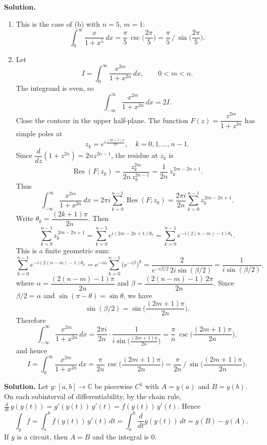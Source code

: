 \noindent\textbf{Solution.}
\begin{enumerate}[label=(\alph*)]
\item This is the case of (b) with $n=5$, $m=1$:
\[\int_0^{\infty}\frac{x}{1+x^5}\,dx=\frac{\pi}{5}\,\csc\!\Big(\frac{2\pi}{5}\Big)=\frac{\pi}{5}\,\Big/\,\sin\!\Big(\frac{2\pi}{5}\Big).\]

\item Let
\[I=\int_0^{\infty}\frac{x^{2m}}{1+x^{2n}}\,dx,\qquad 0<m<n.\]
The integrand is even, so
\[\int_{-\infty}^{\infty}\frac{x^{2m}}{1+x^{2n}}\,dx=2I.\]
Close the contour in the upper half-plane. The function $F(z)=\dfrac{z^{2m}}{1+z^{2n}}$ has simple poles at
\[z_k=e^{i\frac{(2k+1)\pi}{2n}},\quad k=0,1,\dots,n-1.\]
Since $\dfrac{d}{dz}(1+z^{2n})=2n z^{2n-1}$, the residue at $z_k$ is
\[\operatorname{Res}(F;z_k)=\frac{z_k^{2m}}{2n\,z_k^{2n-1}}=\frac{1}{2n}\,z_k^{\,2m-2n+1}.\]
Thus
\[\int_{-\infty}^{\infty}\frac{x^{2m}}{1+x^{2n}}\,dx=2\pi i\sum_{k=0}^{n-1}\operatorname{Res}(F;z_k)=\frac{2\pi i}{2n}\sum_{k=0}^{n-1} z_k^{\,2m-2n+1}.\]
Write $\theta_k=\dfrac{(2k+1)\pi}{2n}$. Then
\[\sum_{k=0}^{n-1} z_k^{\,2m-2n+1}=\sum_{k=0}^{n-1} e^{i(2m-2n+1)\theta_k}=\sum_{k=0}^{n-1} e^{-i(2(n-m)-1)\theta_k}.
\]
This is a finite geometric sum:
\[\sum_{k=0}^{n-1} e^{-i(2(n-m)-1)\theta_k}=e^{-i\alpha}\sum_{k=0}^{n-1} \Big(e^{-i\beta}\Big)^k=\frac{2}{e^{-i\beta/2}\,2i\sin(\beta/2)}=\frac{1}{i\sin(\beta/2)},\]
where $\alpha=\dfrac{(2(n-m)-1)\pi}{2n}$ and $\beta=\dfrac{(2(n-m)-1)\,2\pi}{2n}$. Since $\beta/2=\alpha$ and $\sin(\pi-\theta)=\sin\theta$, we have
\[\sin(\beta/2)=\sin\!\Big(\frac{(2m+1)\pi}{2n}\Big).\]
Therefore
\[\int_{-\infty}^{\infty}\frac{x^{2m}}{1+x^{2n}}\,dx=\frac{2\pi i}{2n}\cdot\frac{1}{i\sin\!\big(\frac{(2m+1)\pi}{2n}\big)}=\frac{\pi}{n}\,\csc\!\Big(\frac{(2m+1)\pi}{2n}\Big),\]
and hence
\[I=\int_0^{\infty}\frac{x^{2m}}{1+x^{2n}}\,dx=\frac{\pi}{2n}\,\csc\!\Big(\frac{(2m+1)\pi}{2n}\Big)=\frac{\pi}{2n}\,\Big/\,\sin\!\Big(\frac{(2m+1)\pi}{2n}\Big).\]
\end{enumerate}

\noindent\textbf{Solution.}
Let $y:[a,b]\to\mathbb C$ be piecewise $C^1$ with $A=y(a)$ and $B=y(b)$. On each subinterval of differentiability, by the chain rule, $\frac{d}{dt}\,g(y(t))=g'(y(t))\,y'(t)=f(y(t))\,y'(t)$. Hence
\[\int_y f=\int_a^b f(y(t))\,y'(t)\,dt=\int_a^b \frac{d}{dt}g(y(t))\,dt=g(B)-g(A).\]
If $y$ is a circuit, then $A=B$ and the integral is $0$.

